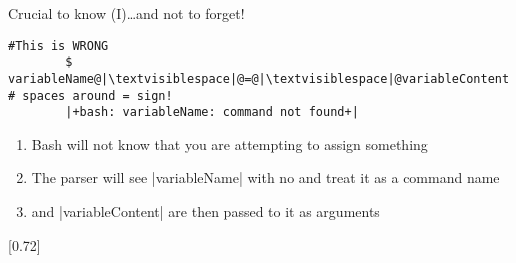 \begin{frame}[fragile]{Crucial to know (I)}{\ldots{}and not to forget!}
    \begin{lstlisting}[style=MyBash, numbers=none]
        #This is WRONG
        $ variableName@|\textvisiblespace|@=@|\textvisiblespace|@variableContent   # spaces around = sign!
        |+bash: variableName: command not found+|
    \end{lstlisting}
    \bigskip
    \begin{enumerate}
        \item Bash will not know that you are attempting to assign something
        \item The parser will see \bash|variableName| with no \bash{=} and treat it as a command name
        \item \bash{=} and \bash|variableContent| are then passed to it as arguments
    \end{enumerate}
    \bigskip
    \begin{varblock}{}[0.72\textwidth]{}
        \Large{}
    \end{varblock}
    
\end{frame}

